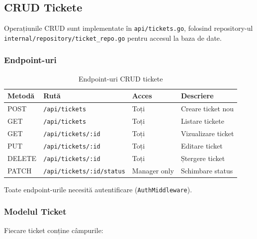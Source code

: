 \documentclass[12pt]{article}
\begin{document}
\subsection{CRUD Tickete}

Operațiunile CRUD sunt implementate în \texttt{api/tickets.go}, folosind repository-ul
\texttt{internal/repository/ticket\_repo.go} pentru accesul la baza de date.

\subsubsection*{Endpoint-uri}

\begin{table}[H]
\centering
\begin{tabular}{|l|l|l|l|}
\hline
\textbf{Metodă} & \textbf{Rută} & \textbf{Acces} & \textbf{Descriere} \\
\hline
POST  & \texttt{/api/tickets}           & Toți           & Creare ticket nou \\
GET   & \texttt{/api/tickets}           & Toți           & Listare tickete \\
GET   & \texttt{/api/tickets/:id}       & Toți           & Vizualizare ticket \\
PUT   & \texttt{/api/tickets/:id}       & Toți           & Editare ticket \\
DELETE& \texttt{/api/tickets/:id}       & Toți           & Ștergere ticket \\
PATCH & \texttt{/api/tickets/:id/status}& Manager only   & Schimbare status \\
\hline
\end{tabular}
\caption{Endpoint-uri CRUD tickete}
\end{table}

Toate endpoint-urile necesită autentificare (\texttt{AuthMiddleware}).

\subsubsection*{Modelul Ticket}

Fiecare ticket conține câmpurile:
\end{document}
